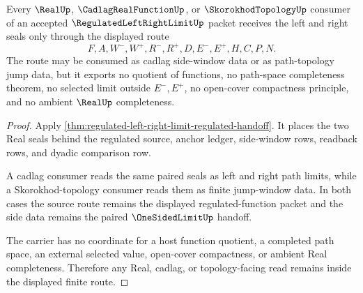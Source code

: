 \begin{theorem}
\label{thm:regulated-left-right-limit-real-seal-nonescape}
Every $\RealUp$, $\CadlagRealFunctionUp$, or $\SkorokhodTopologyUp$ consumer of an accepted $\RegulatedLeftRightLimitUp$ packet receives the left and right seals only through the displayed route
$$
F,A,W^-,W^+,R^-,R^+,D,E^-,E^+,H,C,P,N.
$$
The route may be consumed as cadlag side-window data or as path-topology jump data, but it exports no quotient of functions, no path-space completeness theorem, no selected limit outside $E^-,E^+$, no open-cover compactness principle, and no ambient $\RealUp$ completeness.
\end{theorem}
\begin{proof}
Apply \autoref{thm:regulated-left-right-limit-regulated-handoff}. It places the two Real seals behind the regulated source, anchor ledger, side-window rows, readback rows, and dyadic comparison row.

A cadlag consumer reads the same paired seals as left and right path limits, while a Skorokhod-topology consumer reads them as finite jump-window data. In both cases the source route remains the displayed regulated-function packet and the side data remains the paired $\OneSidedLimitUp$ handoff.

The carrier has no coordinate for a host function quotient, a completed path space, an external selected value, open-cover compactness, or ambient Real completeness. Therefore any Real, cadlag, or topology-facing read remains inside the displayed finite route.
\end{proof}



